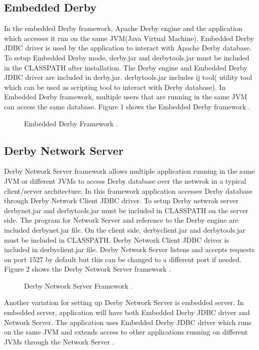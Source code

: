 \documentclass[9pt,twocolumn,twoside]{../../styles/osajnl}
\begin{document}
\subsection{Embedded Derby}
In the embedded Derby framework, Apache Derby engine and the
application which accesses it run on the same JVM(Java Virtual
Machine). Embedded Derby JDBC driver is used by the application to
interact with Apache Derby database. To setup Embedded Derby mode,
derby.jar and derbytools.jar must be included in the CLASSPATH after
installation. The Derby engine and Embedded Derby JDBC driver are
included in derby.jar. derbytools.jar includes ij tool( utility tool
which can be used as scripting tool to interact with Derby
database). In Embedded Derby framework, multiple users that are
running in the same JVM can access the same database. Figure 1 shows
the Embedded Derby framework \cite {www-derbytutorial}.

\begin{figure}[htbp]
\caption{Embedded Derby Framework  \cite {www-derbytutorial}.}
\end{figure}


\subsection{Derby Network Server}
Derby Network Server framework allows multiple application running
in the same JVM or different JVMs to access Derby database over the
netwrok in a typical client/server architecture. In this framework
application accesses Derby database through Derby Network Client JDBC
driver. To setup Derby netwrok server derbynet.jar and derbytools.jar
must be included in CLASSPATH on the server side. The program for
Network Server and reference to the Derby engine are included
derbynet.jar file. On the client side, derbyclient.jar and
derbytools.jar must be included in CLASSPATH. Derby Network Client
JDBC driver is included in derbyclient.jar file. Derby Network Server
listens and accepts requests on port 1527 by default but this can be
changed to a different port if needed. Figure 2 shows the Derby
Network Server framework \cite {www-derbytutorial}.

\begin{figure}[htbp]
\caption{Derby Network Server Framework  \cite {www-derbytutorial}.}
\end{figure}

Another variation for setting up Derby Network Server is embedded
server. In embedded server, application will have both Embedded Derby
JDBC driver and Network Server. The application uses Embedded Derby
JDBC driver which runs on the same JVM and extends access to other
applications running on different JVMs through the Network Server
\cite {www-derbytutorial}.
\end{document}
